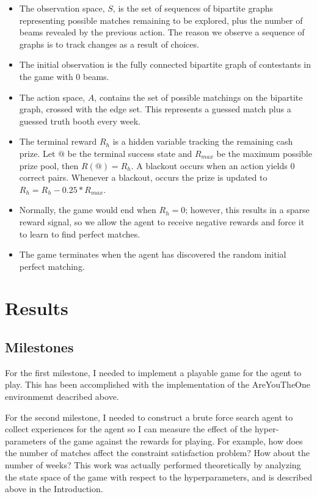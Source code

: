 \documentclass{article}
\begin{document}
\begin{itemize}
  \item The observation space, $S$, is the set of sequences of bipartite
        graphs representing possible matches remaining to be explored, plus
        the number of beams revealed by the previous action. The reason we
        observe a sequence of graphs is to track changes as a result of choices.
  \item The initial observation is the fully connected bipartite graph
        of contestants in the game with 0 beams.
  \item The action space, $A$, contains the set of possible matchings on
        the bipartite graph, crossed with the edge set. This represents a
        guessed match plus a guessed truth booth every week.
  \item The terminal reward $R_h$ is a hidden variable tracking the remaining
        cash prize. Let $@$ be the terminal success state and $R_{max}$ be the
        maximum possible prize pool, then $R(@) = R_h$. A blackout occurs when
        an action yields 0 correct pairs. Whenever a blackout, occurs the prize
        is updated to $R_h = R_h - 0.25 * R_{max}$.
  \item Normally, the game would end when $R_h = 0$; however, this results in
        a sparse reward signal, so we allow the agent to receive negative rewards
        and force it to learn to find perfect matches.
  \item The game terminates when the agent has discovered the random initial
        perfect matching.
\end{itemize}


\section{Results}

\subsection{Milestones}

For the first milestone, I needed to implement a playable game for the
agent to play. This has been accomplished with the implementation of the
AreYouTheOne environmemt deacribed above.

For the second milestone, I needed to construct a brute force search agent
to collect experiences for the agent so I can measure the effect of the
hyper-parameters of the game against the rewards for playing. For example,
how does the number of matches affect the constraint satisfaction problem?
How about the number of weeks? This work was actually performed theoretically
by analyzing the state space of the game with respect to the hyperparameters,
and is described above in the Introduction.
\end{document}
